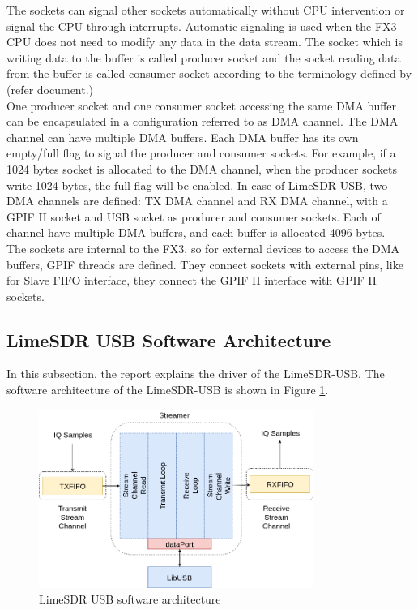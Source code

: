 The sockets can signal other sockets automatically without CPU intervention or signal the CPU through interrupts.
Automatic signaling is used when the FX3 CPU does not need to modify any data in the data stream.
The socket which is writing data to the buffer is called producer socket and the socket reading data from the buffer is called consumer socket according to the terminology defined by (refer document.)\\

One producer socket and one consumer socket accessing the same \ac{DMA} buffer can be encapsulated in a configuration referred to as \ac{DMA} channel.
The \ac{DMA} channel can have multiple \ac{DMA} buffers.
Each DMA buffer has its own empty/full flag to signal the producer and consumer sockets.
For example, if a 1024 bytes socket is allocated to the DMA channel, when the producer sockets write 1024 bytes, the full flag will be enabled.
In case of LimeSDR-USB, two \ac{DMA} channels are defined: TX \ac{DMA} channel and RX \ac{DMA} channel, with a GPIF II socket and USB socket as producer and consumer sockets.
Each of channel have multiple \ac{DMA} buffers, and each buffer is allocated 4096 bytes.\\

The sockets are internal to the FX3, so for external devices to access the \ac{DMA} buffers, GPIF threads are defined.
They connect sockets with external pins, like for Slave FIFO interface, they connect the GPIF II interface with GPIF II sockets.\\


\subsection{LimeSDR USB Software Architecture}

In this subsection, the report explains the driver of the LimeSDR-USB.
The software architecture of the LimeSDR-USB is shown in Figure \ref{Lime_Software}.\\

\begin{figure}[h!]
\centering
\includegraphics[width=0.8\textwidth]{Figure/Lime_Software.png}
\caption{LimeSDR USB software architecture}
\label{Lime_Software}
\end{figure}

